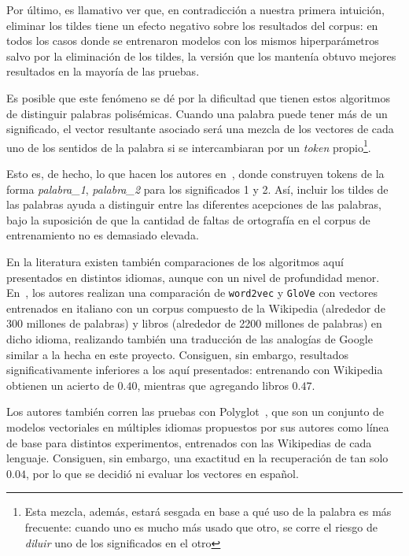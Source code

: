 Por último, es llamativo ver que, en contradicción a nuestra primera intuición, eliminar los tildes
tiene un efecto negativo sobre los resultados del corpus: en todos los casos donde se entrenaron
modelos con los mismos hiperparámetros salvo por la eliminación de los tildes, la versión que los
mantenía obtuvo mejores resultados en la mayoría de las pruebas.

Es posible que este fenómeno se dé por la dificultad que tienen estos algoritmos de distinguir
palabras polisémicas. Cuando una palabra puede tener más de un significado, el vector resultante
asociado será una mezcla de los vectores de cada uno de los sentidos de la palabra si se
intercambiaran por un \textit{token} propio\footnote{Esta mezcla, además, estará sesgada en base a
qué uso de la palabra es más frecuente: cuando uno es mucho más usado que otro, se corre el riesgo
de \textit{diluir} uno de los significados en el otro}.

Esto es, de hecho, lo que hacen los autores en~\cite{Huang2012,Tian2014}, donde construyen tokens de
la forma \textit{palabra\_1}, \textit{palabra\_2} para los significados 1 y 2. Así, incluir los
tildes de las palabras ayuda a distinguir entre las diferentes acepciones de las palabras, bajo la
suposición de que la cantidad de faltas de ortografía en el corpus de entrenamiento no es demasiado
elevada.

En la literatura existen también comparaciones de los algoritmos aquí presentados en distintos
idiomas, aunque con un nivel de profundidad menor. En~\cite{Berardi2015}, los autores realizan una
comparación de \texttt{word2vec} y \texttt{GloVe} con vectores entrenados en italiano con un corpus
compuesto de la Wikipedia (alrededor de 300 millones de palabras) y libros (alrededor de 2200
millones de palabras) en dicho idioma, realizando también una traducción de las analogías de Google
similar a la hecha en este proyecto. Consiguen, sin embargo, resultados significativamente
inferiores a los aquí presentados: entrenando con Wikipedia obtienen un acierto de $0.40$, mientras
que agregando libros $0.47$.

Los autores también corren las pruebas con Polyglot~\cite{AlRfou2013}, que son un conjunto de
modelos vectoriales en múltiples idiomas propuestos por sus autores como línea de base para
distintos experimentos, entrenados con las Wikipedias de cada lenguaje. Consiguen, sin embargo, una
exactitud en la recuperación de tan solo $0.04$, por lo que se decidió ni evaluar los vectores en
español.

